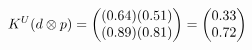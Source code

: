 \documentclass[preview]{standalone}
\begin{document}
\begin{align*}
\special{dvisvgm:raw <g id='unique000'>}K^U(d \otimes p) = \begin{pmatrix} (0.64)(0.51) \\ (0.89)(0.81) \end{pmatrix} = \begin{pmatrix} 0.33 \\ 0.72 \end{pmatrix}\special{dvisvgm:raw </g>}
\end{align*}
\end{document}
